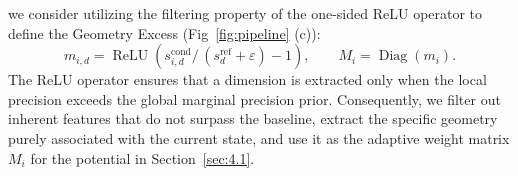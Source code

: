 we consider utilizing the filtering property of the one-sided ReLU operator to define the Geometry Excess (Fig~\ref{fig:pipeline} (c)):
\begin{equation}
    m_{i,d}=\operatorname{ReLU}\left(s_{i,d}^{\mathrm{cond}} \Big/ \, (s_d^{\mathrm{ref}}+\varepsilon)-1\right),
    \qquad
    M_i=\operatorname{Diag}(m_i).
\end{equation}
The ReLU operator ensures that a dimension is extracted only when 
the local precision exceeds the global marginal precision prior. 
Consequently, we filter out inherent features that do not surpass the baseline, 
extract the specific geometry purely associated with the current state, 
and use it as the adaptive weight matrix \(M_i\) for the potential in Section~\ref{sec:4.1}.